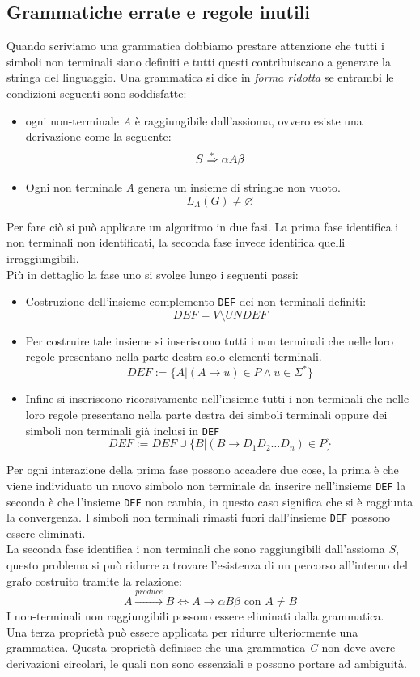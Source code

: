 \subsection{Grammatiche errate e regole inutili}
Quando scriviamo una grammatica dobbiamo prestare attenzione che tutti i simboli non terminali siano definiti e tutti questi contribuiscano a generare la stringa del linguaggio. 
Una grammatica si dice in \emph{forma ridotta} se entrambi le condizioni seguenti sono soddisfatte:
\begin{itemize}
\item ogni non-terminale \emph{A} è raggiungibile dall'assioma, ovvero esiste una derivazione come la seguente:
$$S \xRightarrow{*} \alpha A\beta$$
\item Ogni non terminale \emph{A} genera un insieme di stringhe non vuoto.
$$L_A(G) \neq \varnothing$$
\end{itemize}
Per fare ciò si può applicare un algoritmo in due fasi. La prima fase identifica i non terminali non identificati, la seconda fase invece identifica quelli irraggiungibili.\\
Più in dettaglio la fase uno si svolge lungo i seguenti passi:
\begin{itemize}
\item Costruzione dell'insieme complemento \texttt{DEF}	dei non-terminali definiti:
$$DEF = V\setminus UNDEF$$
\item Per costruire tale insieme si inseriscono tutti i non terminali che nelle loro regole presentano nella parte destra solo elementi terminali.
$$DEF:= \{A|(A\rightarrow u)\in P \wedge u\in \Sigma^* \}$$
\item Infine si inseriscono ricorsivamente nell'insieme tutti i non terminali che nelle loro regole presentano nella parte destra dei simboli terminali oppure dei simboli non terminali già inclusi in \texttt{DEF}
$$DEF:= DEF \cup \{B| (B\rightarrow D_1D_2\dots D_n)\in P \}$$
\end{itemize}
Per ogni interazione della prima fase possono accadere due cose, la prima è che viene individuato un nuovo simbolo non terminale da inserire nell'insieme \texttt{DEF} la seconda è che l'insieme \texttt{DEF} non cambia, in questo caso significa che si è raggiunta la convergenza. I simboli non terminali rimasti fuori dall'insieme \texttt{DEF} possono essere eliminati.\\
La seconda fase identifica i non terminali che sono raggiungibili dall'assioma $ S $, questo problema si può ridurre a trovare l'esistenza di un percorso all'interno del grafo costruito tramite la relazione:
$$A\xrightarrow{produce} B \iff A\rightarrow \alpha B\beta \text{ con } A\neq B$$
I non-terminali non raggiungibili possono essere eliminati dalla grammatica.\\
Una terza proprietà può essere applicata per ridurre ulteriormente una grammatica. Questa proprietà definisce che una grammatica \emph{G} non deve avere derivazioni circolari, le quali non sono essenziali e possono portare ad ambiguità.\\
